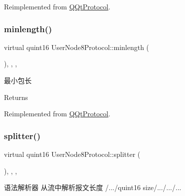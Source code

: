 Reimplemented from \mbox{\hyperlink{class_q_qt_protocol_af41bc3116abbbcfc9af45e151a253ff7}{Q\+Qt\+Protocol}}.

\mbox{\label{class_user_node8_protocol_a3dc285f4225042610baaea92366f4afd}} 
\subsubsection{\texorpdfstring{minlength()}{minlength()}}
{\footnotesize\ttfamily virtual quint16 User\+Node8\+Protocol\+::minlength (\begin{DoxyParamCaption}{ }\end{DoxyParamCaption})\hspace{0.3cm}{\ttfamily [inline]}, {\ttfamily [override]}, {\ttfamily [protected]}, {\ttfamily [virtual]}}



最小包长 

\begin{DoxyReturn}{Returns}

\end{DoxyReturn}


Reimplemented from \mbox{\hyperlink{class_q_qt_protocol_a2b00f53d3dd0eed817eeecff422891f3}{Q\+Qt\+Protocol}}.

\mbox{\label{class_user_node8_protocol_a518106d72486f6d041836e6a59e5ccd5}} 
\subsubsection{\texorpdfstring{splitter()}{splitter()}}
{\footnotesize\ttfamily virtual quint16 User\+Node8\+Protocol\+::splitter (\begin{DoxyParamCaption}\item[{const Q\+Byte\+Array \&}]{ }\end{DoxyParamCaption})\hspace{0.3cm}{\ttfamily [inline]}, {\ttfamily [override]}, {\ttfamily [protected]}, {\ttfamily [virtual]}}



语法解析器 从流中解析报文长度 /.../quint16 size/.../.../... 


